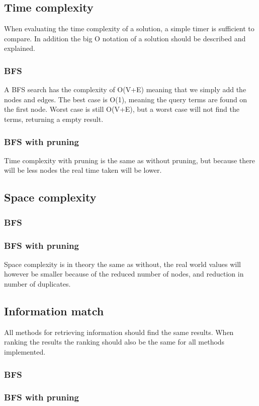 \subsection{Time complexity}
When evaluating the time complexity of a solution, a simple timer is sufficient to compare. In addition the big O notation of a solution should be described and explained.

\subsubsection{BFS}
A BFS search has the complexity of O(V+E) meaning that we simply add the nodes and edges. The best case is O(1), meaning the query terms are found on the first node. Worst case is still O(V+E), but a worst case will not find the terms, returning a empty result.\\

\subsubsection{BFS with pruning}
Time complexity with pruning is the same as without pruning, but because there will be less nodes the real time taken will be lower.\\

\subsection{Space complexity}
\subsubsection{BFS}

\subsubsection{BFS with pruning}
Space complexity is in theory the same as without, the real world values will however be smaller because of the reduced number of nodes, and reduction in number of duplicates.\\

\subsection{Information match}
All methods for retrieving information should find the same results. When ranking the results the ranking should also be the same for all methods implemented.\\

\subsubsection{BFS}

\subsubsection{BFS with pruning}


\clearpage